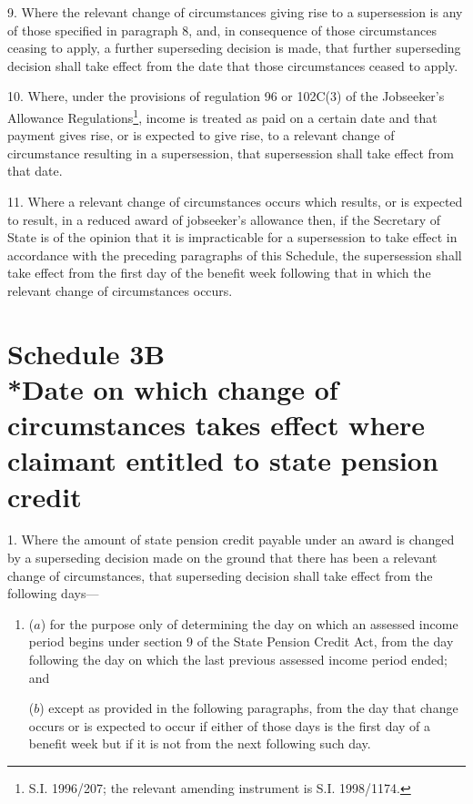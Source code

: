 \documentclass[12pt,a4paper]{article}
\begin{document}
\medskip

9.  Where the relevant change of circumstances giving rise to a supersession is any of those specified in paragraph 8, and, in consequence of those circumstances ceasing to apply, a further superseding decision is made, that further superseding decision shall take effect from the date that those circumstances ceased to apply.

\medskip

10.  Where, under the provisions of regulation 96 or 102C(3) of the Jobseeker’s Allowance Regulations\footnote{\frenchspacing S.I. 1996/207; the relevant amending instrument is S.I. 1998/1174.}, income is treated as paid on a certain date and that payment gives rise, or is expected to give rise, to a relevant change of circumstance resulting in a supersession, that supersession shall take effect from that date.

\medskip

11.  Where a relevant change of circumstances occurs which results, or is expected to result, in a reduced award of jobseeker’s allowance then, if the Secretary of State is of the opinion that it is impracticable for a supersession to take effect in accordance with the preceding paragraphs of this Schedule, the supersession shall take effect from the first day of the benefit week following that in which the relevant change of circumstances occurs.

\part[Schedule 3B --- Date on which change of circumstances takes effect where claimant entitled to state pension credit]{Schedule 3B\\*Date on which change of circumstances takes effect where claimant entitled to state pension credit}

\renewcommand\parthead{--- Schedule 3B}


\medskip

1.  Where the amount of state pension credit payable under an award is changed by a superseding decision made on the ground that there has been a relevant change of circumstances, that superseding decision shall take effect from the following days—
\begin{enumerate}\item[]
($a$) for the purpose only of determining the day on which an assessed income period begins under section 9 of the State Pension Credit Act, from the day following the day on which the last previous assessed income period ended; and

($b$) except as provided in the following paragraphs, from the day that change occurs or is expected to occur if either of those days is the first day of a benefit week but if it is not from the next following such day.
\end{enumerate}
\end{document}
